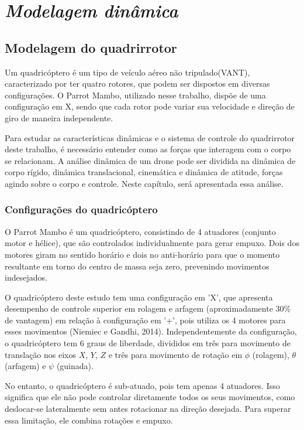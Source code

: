 \chapter{\textit{Modelagem dinâmica}}

\section{Modelagem do quadrirrotor}
Um quadricóptero é um tipo de veículo aéreo não tripulado(VANT), caracterizado por ter quatro rotores, que podem ser dispostos em diversas configurações. O Parrot Mambo, utilizado nesse trabalho, dispõe de uma configuração em X, sendo que cada rotor pode variar sua velocidade e direção de giro de maneira independente.

Para estudar as características dinâmicas e o sistema de controle do quadrirrotor deste trabalho, é necessário entender como as forças que interagem com o corpo se relacionam. A análise dinâmica de um drone pode ser dividida na dinâmica de corpo rígido, dinâmica translacional, cinemática e dinâmica de atitude, forças agindo sobre o corpo e controle. Neste capítulo, será apresentada essa análise.

\subsection{Configurações do quadricóptero}
O Parrot Mambo é um quadricóptero, consistindo de 4 atuadores (conjunto motor e hélice), que são controlados individualmente para gerar empuxo. Dois dos motores giram no sentido horário e dois no anti-horário para que o momento resultante em torno do centro de massa seja zero, prevenindo movimentos indesejados.

O quadricóptero deste estudo tem uma configuração em 'X', que apresenta desempenho de controle superior em rolagem e arfagem (aproximadamente 30\% de vantagem) em relação à configuração em '+', pois utiliza os 4 motores para esses movimentos (Niemiec e Gandhi, 2014). Independentemente da configuração, o quadricóptero tem 6 graus de liberdade, divididos em três para movimento de translação nos eixos \( X \), \( Y \), \( Z \) e três para movimento de rotação em \( \phi \) (rolagem), \( \theta \) (arfagem) e \( \psi \) (guinada).

No entanto, o quadricóptero é sub-atuado, pois tem apenas 4 atuadores. Isso significa que ele não pode controlar diretamente todos os seus movimentos, como deslocar-se lateralmente sem antes rotacionar na direção desejada. Para superar essa limitação, ele combina rotações e empuxo.

